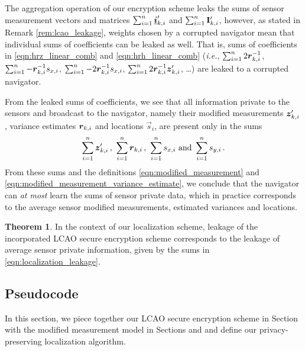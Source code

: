 \documentclass[10pt,letterpaper,oneside,twocolumn,journal]{IEEEtran}
\theoremstyle{definition}
\theoremstyle{definition}
\newtheorem{theorem}{Theorem}[section]
\theoremstyle{remark}
\begin{document}
The aggregation operation of our encryption scheme leaks the sums of sensor measurement vectors and matrices $\sum_{i=1}^n{\boldsymbol{\underline{i}}}'_{k,i}$ and $\sum_{i=1}^n{{\mathbf{I}}}'_{k,i}$, however, as stated in Remark \ref{rem:lcao_leakage}, weights chosen by a corrupted navigator mean that individual sums of coefficients can be leaked as well. That is, sums of coefficients in \eqref{eqn:hrz_linear_comb} and \eqref{eqn:hrh_linear_comb} (\textit{i.e.}, $\sum_{i=1}^n2{\boldsymbol{r}}^{-1}_{k,i}$, $\sum_{i=1}^n-{\boldsymbol{r}}^{-1}_{k,i}s_{x,i}$, $\sum_{i=1}^n-2{\boldsymbol{r}}^{-1}_{k,i}s_{x,i}$, $\sum_{i=1}^n2{\boldsymbol{r}}^{-1}_{k,i}{\boldsymbol{z}}'_{k,i}$, \dots) are leaked to a corrupted navigator.

From the leaked sums of coefficients, we see that all information private to the sensors and broadcast to the navigator, namely their modified measurements ${\boldsymbol{z}}'_{k,i}$, variance estimates ${\boldsymbol{r}}_{k,i}$ and locations $\vec{s}_i$, are present only in the sums
\begin{equation}
    \sum_{i=1}^n\rv{z}'_{k,i}\,,\ \sum_{i=1}^n\rv{r}_{k,i}\,,\ \sum_{i=1}^ns_{x,i}\ \textrm{and}\ \sum_{i=1}^ns_{y,i}\,.\label{eqn:localization_leakage}
\end{equation}
From these sums and the definitions \eqref{eqn:modified_measurement} and \eqref{eqn:modified_measurement_variance_estimate}, we conclude that the navigator can \textit{at most} learn the sums of sensor private data, which in practice corresponds to the average sensor modified measurements, estimated variances and locations.
\begin{theorem}
    In the context of our localization scheme, leakage of the incorporated LCAO secure encryption scheme corresponds to the leakage of average sensor private information, given by the sums in \eqref{eqn:localization_leakage}.
\end{theorem}

% 
% 

\subsection{Pseudocode} \label{subsec:pseudocode}
In this section, we piece together our LCAO secure encryption scheme in Section  with the modified measurement model in Sections  and  and define our privacy-preserving localization algorithm.
\end{document}
